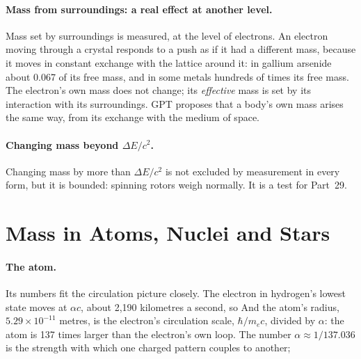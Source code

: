 \documentclass[11pt,a4paper]{article}
\begin{document}
\paragraph{Mass from surroundings: a real effect at another level.} Mass set by surroundings is measured, at the level of electrons. An electron moving through a crystal responds to a push as if it had a different mass, because it moves in constant exchange with the lattice around it: in gallium arsenide about 0.067 of its free mass, and in some metals hundreds of times its free mass. The electron's own mass does not change; its \emph{effective} mass is set by its interaction with its surroundings.  GPT proposes that a body's own mass arises the same way, from its exchange with the medium of space.

\paragraph{Changing mass beyond $\Delta E/c^2$.} Changing mass by more than $\Delta E/c^2$ is not excluded by measurement in every form, but it is bounded: spinning rotors weigh normally.  It is a test for Part~29.

\section{Mass in Atoms, Nuclei and Stars}
\label{sec:binding}

\paragraph{The atom.}  Its numbers fit the circulation picture closely. The electron in hydrogen's lowest state moves at $\alpha c$, about 2,190 kilometres a second, so  And the atom's radius, $5.29\times10^{-11}$ metres, is the electron's circulation scale, $\hbar/m_e c$, divided by $\alpha$: the atom is 137 times larger than the electron's own loop. The number $\alpha \approx 1/137.036$ is the strength with which one charged pattern couples to another; 
\end{document}

